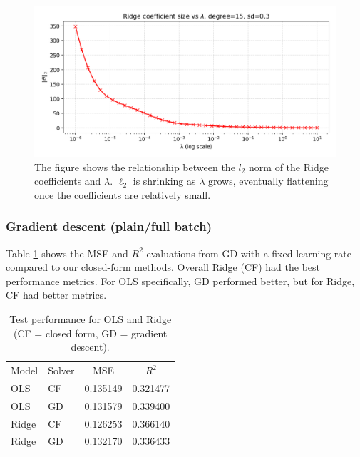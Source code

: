 \documentclass[amssymb,twocolumn,aps]{revtex4-2}
\begin{document}
\begin{figure}[H]
    \centering
    \includegraphics[width=1\linewidth]{Project-1/Figures/ridge_theta_norms_vs_lambda.png}
    \caption{The figure shows the relationship between the $l_2$ norm of the Ridge coefficients and $\lambda$. $\ell_2$ is shrinking as $\lambda$ grows, eventually flattening once the coefficients are relatively small.}
    \label{fig:ridge_theta_norms}
\end{figure}

\subsubsection{Gradient descent (plain/full batch)}

Table \ref{tab:test-ols-ridge} shows the MSE and $R^2$ evaluations from GD with a fixed learning rate compared to our closed-form methods. Overall Ridge (CF) had the best performance metrics. For OLS specifically, GD performed better, but for Ridge, CF had better metrics. 

\begin{table}[h!]  %
\caption{Test performance for OLS and Ridge (CF = closed form, GD = gradient descent).}
\label{tab:test-ols-ridge}
\begin{ruledtabular}
\begin{tabular}{llcc} %
Model & Solver & MSE & $R^2$ \\
\colrule
OLS   & CF & 0.135149 & 0.321477 \\
OLS   & GD & 0.131579 & 0.339400 \\
Ridge & CF & 0.126253 & 0.366140 \\
Ridge & GD & 0.132170 & 0.336433 \\
\end{tabular}
\end{ruledtabular}
\end{table}
\end{document}

